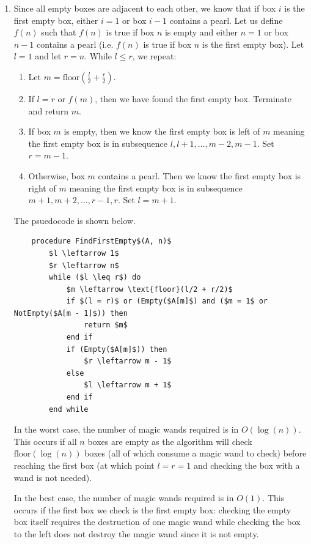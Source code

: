 \documentclass[11pt, letterpaper, titlepage]{article}
\begin{document}
\begin{enumerate}[label=\alph*)]
    \item Since all empty boxes are adjacent to each other, we know that if box $i$ is the first empty box, either $i = 1$ or box $i - 1$ contains a pearl. Let us define $f(n)$ such that $f(n)$ is true if box $n$ is empty and either $n = 1$ or box $n - 1$ contains a pearl (i.e. $f(n)$ is true if box $n$ is the first empty box).  Let $l = 1$ and let $r = n$. While $l \leq r$, we repeat:
    \begin{enumerate}[label=\arabic*)]
        \item Let $m = \text{floor}\left(\frac{l}{2} + \frac{r}{2}\right)$.
        \item If $l = r$ or $f(m)$, then we have found the first empty box. Terminate and return $m$.
        \item If box $m$ is empty, then we know the first empty box is left of $m$ meaning the first empty box is in subsequence $l, l+1, \ldots, m-2, m-1$. Set $r = m - 1$. 
        \item Otherwise, box $m$ contains a pearl. Then we know the first empty box is right of $m$ meaning the first empty box is in subsequence $m+1, m+2, \ldots, r - 1, r$. Set $l = m + 1$.
    \end{enumerate}

    The psuedocode is shown below.
    \begin{lstlisting}
    procedure FindFirstEmpty$(A, n)$
        $l \leftarrow 1$
        $r \leftarrow n$
        while ($l \leq r$) do
            $m \leftarrow \text{floor}(l/2 + r/2)$
            if $(l = r)$ or (Empty($A[m]$) and ($m = 1$ or NotEmpty($A[m - 1]$)) then
                return $m$
            end if
            if (Empty($A[m]$)) then 
                $r \leftarrow m - 1$
            else
                $l \leftarrow m + 1$
            end if
        end while
    \end{lstlisting}

    In the worst case, the number of magic wands required is in $O(\log(n))$. This occurs if all $n$ boxes are empty as the algorithm will check $\text{floor}(\log(n))$ boxes (all of which consume a magic wand to check) before reaching the first box (at which point $l = r = 1$ and checking the box with a wand is not needed).
    
    In the best case, the number of magic wands required is in $O(1)$. This occurs if the first box we check is the first empty box: checking the empty box itself requires the destruction of one magic wand while checking the box to the left does not destroy the magic wand since it is not empty.

    
\end{enumerate}
\end{document}
